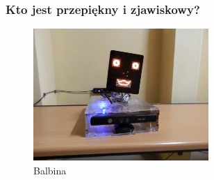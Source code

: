 \documentclass[xcolor=dvipsnames]{beamer}%
\begin{document}
\begin{frame}
	\frametitle{Kto jest przepiękny i zjawiskowy?}
	\centering \begin{figure}
		\includegraphics[height=5cm]{figure/balbina.jpg}
		\caption{Balbina}
	\end{figure}
\end{frame}
\end{document}

